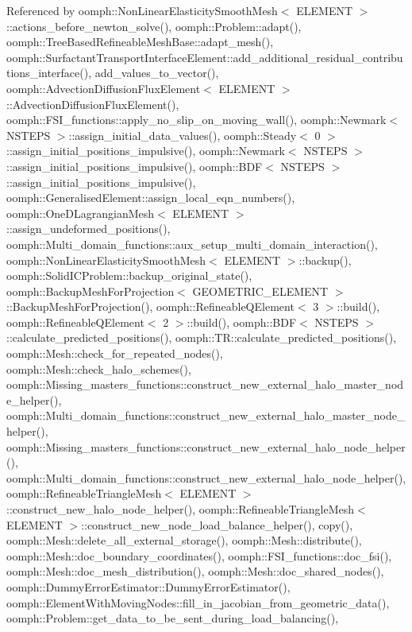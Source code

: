 Referenced by oomph\+::\+Non\+Linear\+Elasticity\+Smooth\+Mesh$<$ E\+L\+E\+M\+E\+N\+T $>$\+::actions\+\_\+before\+\_\+newton\+\_\+solve(), oomph\+::\+Problem\+::adapt(), oomph\+::\+Tree\+Based\+Refineable\+Mesh\+Base\+::adapt\+\_\+mesh(), oomph\+::\+Surfactant\+Transport\+Interface\+Element\+::add\+\_\+additional\+\_\+residual\+\_\+contributions\+\_\+interface(), add\+\_\+values\+\_\+to\+\_\+vector(), oomph\+::\+Advection\+Diffusion\+Flux\+Element$<$ E\+L\+E\+M\+E\+N\+T $>$\+::\+Advection\+Diffusion\+Flux\+Element(), oomph\+::\+F\+S\+I\+\_\+functions\+::apply\+\_\+no\+\_\+slip\+\_\+on\+\_\+moving\+\_\+wall(), oomph\+::\+Newmark$<$ N\+S\+T\+E\+P\+S $>$\+::assign\+\_\+initial\+\_\+data\+\_\+values(), oomph\+::\+Steady$<$ 0 $>$\+::assign\+\_\+initial\+\_\+positions\+\_\+impulsive(), oomph\+::\+Newmark$<$ N\+S\+T\+E\+P\+S $>$\+::assign\+\_\+initial\+\_\+positions\+\_\+impulsive(), oomph\+::\+B\+D\+F$<$ N\+S\+T\+E\+P\+S $>$\+::assign\+\_\+initial\+\_\+positions\+\_\+impulsive(), oomph\+::\+Generalised\+Element\+::assign\+\_\+local\+\_\+eqn\+\_\+numbers(), oomph\+::\+One\+D\+Lagrangian\+Mesh$<$ E\+L\+E\+M\+E\+N\+T $>$\+::assign\+\_\+undeformed\+\_\+positions(), oomph\+::\+Multi\+\_\+domain\+\_\+functions\+::aux\+\_\+setup\+\_\+multi\+\_\+domain\+\_\+interaction(), oomph\+::\+Non\+Linear\+Elasticity\+Smooth\+Mesh$<$ E\+L\+E\+M\+E\+N\+T $>$\+::backup(), oomph\+::\+Solid\+I\+C\+Problem\+::backup\+\_\+original\+\_\+state(), oomph\+::\+Backup\+Mesh\+For\+Projection$<$ G\+E\+O\+M\+E\+T\+R\+I\+C\+\_\+\+E\+L\+E\+M\+E\+N\+T $>$\+::\+Backup\+Mesh\+For\+Projection(), oomph\+::\+Refineable\+Q\+Element$<$ 3 $>$\+::build(), oomph\+::\+Refineable\+Q\+Element$<$ 2 $>$\+::build(), oomph\+::\+B\+D\+F$<$ N\+S\+T\+E\+P\+S $>$\+::calculate\+\_\+predicted\+\_\+positions(), oomph\+::\+T\+R\+::calculate\+\_\+predicted\+\_\+positions(), oomph\+::\+Mesh\+::check\+\_\+for\+\_\+repeated\+\_\+nodes(), oomph\+::\+Mesh\+::check\+\_\+halo\+\_\+schemes(), oomph\+::\+Missing\+\_\+masters\+\_\+functions\+::construct\+\_\+new\+\_\+external\+\_\+halo\+\_\+master\+\_\+node\+\_\+helper(), oomph\+::\+Multi\+\_\+domain\+\_\+functions\+::construct\+\_\+new\+\_\+external\+\_\+halo\+\_\+master\+\_\+node\+\_\+helper(), oomph\+::\+Missing\+\_\+masters\+\_\+functions\+::construct\+\_\+new\+\_\+external\+\_\+halo\+\_\+node\+\_\+helper(), oomph\+::\+Multi\+\_\+domain\+\_\+functions\+::construct\+\_\+new\+\_\+external\+\_\+halo\+\_\+node\+\_\+helper(), oomph\+::\+Refineable\+Triangle\+Mesh$<$ E\+L\+E\+M\+E\+N\+T $>$\+::construct\+\_\+new\+\_\+halo\+\_\+node\+\_\+helper(), oomph\+::\+Refineable\+Triangle\+Mesh$<$ E\+L\+E\+M\+E\+N\+T $>$\+::construct\+\_\+new\+\_\+node\+\_\+load\+\_\+balance\+\_\+helper(), copy(), oomph\+::\+Mesh\+::delete\+\_\+all\+\_\+external\+\_\+storage(), oomph\+::\+Mesh\+::distribute(), oomph\+::\+Mesh\+::doc\+\_\+boundary\+\_\+coordinates(), oomph\+::\+F\+S\+I\+\_\+functions\+::doc\+\_\+fsi(), oomph\+::\+Mesh\+::doc\+\_\+mesh\+\_\+distribution(), oomph\+::\+Mesh\+::doc\+\_\+shared\+\_\+nodes(), oomph\+::\+Dummy\+Error\+Estimator\+::\+Dummy\+Error\+Estimator(), oomph\+::\+Element\+With\+Moving\+Nodes\+::fill\+\_\+in\+\_\+jacobian\+\_\+from\+\_\+geometric\+\_\+data(), oomph\+::\+Problem\+::get\+\_\+data\+\_\+to\+\_\+be\+\_\+sent\+\_\+during\+\_\+load\+\_\+balancing(), 
